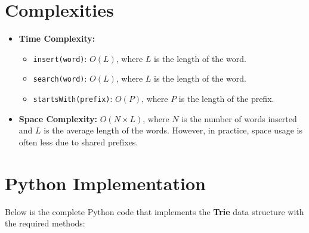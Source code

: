 \section*{Complexities}

\begin{itemize}
    \item \textbf{Time Complexity:}
    \begin{itemize}
        \item \texttt{insert(word)}: \(O(L)\), where \(L\) is the length of the word.
        \item \texttt{search(word)}: \(O(L)\), where \(L\) is the length of the word.
        \item \texttt{startsWith(prefix)}: \(O(P)\), where \(P\) is the length of the prefix.
    \end{itemize}
    
    \item \textbf{Space Complexity:} \(O(N \times L)\), where \(N\) is the number of words inserted and \(L\) is the average length of the words. However, in practice, space usage is often less due to shared prefixes.
\end{itemize}

\section*{Python Implementation}


Below is the complete Python code that implements the \textbf{Trie} data structure with the required methods:

